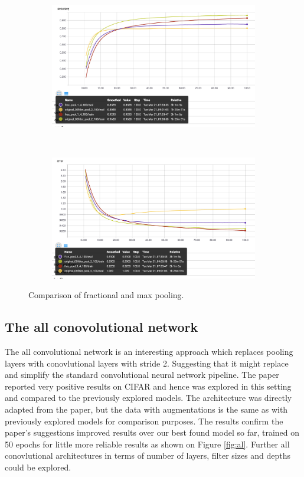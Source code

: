 \documentclass[12pt]{article}
\begin{document}
\begin{figure}[ht!]
    \centering
    \begin{subfigure}[t]{0.475\textwidth}
        \centering
        \includegraphics[width=1.0\linewidth]{disfraca.png}
    \end{subfigure}%
    ~ 
    \begin{subfigure}[t]{0.475\textwidth}
        \centering
        \includegraphics[width=1.0\linewidth]{disfrace.png}
    \end{subfigure}
    \caption{Comparison of fractional and max pooling.}
    \label{fig:fraccomp}
\end{figure}

\subsection*{The all conovolutional network}

The all convolutional network\cite{allconv} is an interesting approach which replaces pooling layers with conovlutional layers with stride 2. Suggesting that it might replace and simplify the standard convolutional neural network pipeline\cite{stan}. The paper reported very positive results on CIFAR and hence was explored in this setting and compared to the previously explored models. The architecture was directly adapted from the paper, but the data with augmentations is the same as with previously explored models for comparison purposes. The results confirm the paper's suggestions improved results over our best found model so far, trained on 50 epochs for little more reliable results as shown on Figure \ref{fig:al}. Further all conovlutional architectures in terms of number of layers, filter sizes and depths could be explored. 
\end{document}
